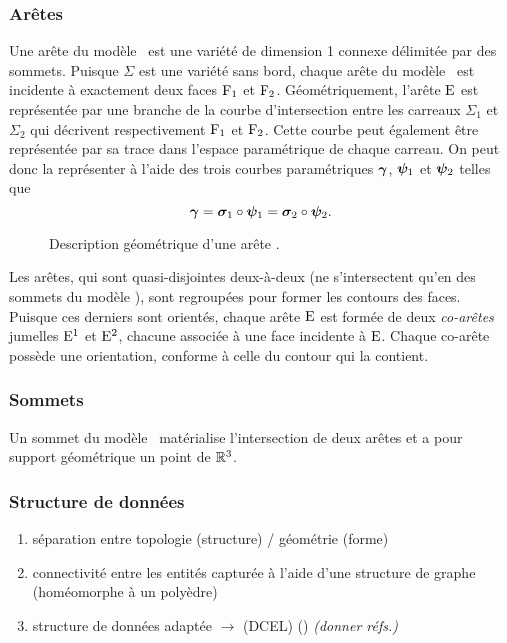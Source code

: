 \subsubsection{Arêtes}
Une arête du modèle \brep\ est une variété de dimension 1 connexe délimitée par des sommets.
Puisque $\Sigma$ est une variété sans bord, chaque arête du modèle \brep\ est incidente à exactement deux faces $\mathrm{F}_1$ et $\mathrm{F}_2$. 
Géométriquement, l'arête $\mathrm{E}$ est représentée par une branche de la courbe d'intersection entre les carreaux $\Sigma_1$ et $\Sigma_2$ qui décrivent respectivement $\mathrm{F}_1$ et $\mathrm{F}_2$. 
Cette courbe peut également être représentée par sa trace dans l'espace paramétrique de chaque carreau. 
On peut donc la représenter à l'aide des trois courbes paramétriques $\bm{\gamma}$, $\bm{\psi}_1$ et $\bm{\psi}_2$ telles que
\begin{equation}
	\bm{\gamma} = \bm{\sigma}_1 \circ \bm{\psi}_1 = \bm{\sigma}_2 \circ \bm{\psi}_2.
\end{equation}

\begin{figure}
	\centering
	
	\caption{Description géométrique d'une arête \brep.}
\end{figure}

Les arêtes, qui sont quasi-disjointes deux-à-deux (\ie ne s'intersectent qu'en des sommets du modèle \brep), sont regroupées pour former les contours des faces. 
Puisque ces derniers sont orientés, chaque arête $\mathrm{E}$ est formée de deux \textit{co-arêtes} jumelles $\mathrm{E}^1$ et $\mathrm{E}^2$, chacune associée à une face incidente à $\mathrm{E}$. 
Chaque co-arête possède une orientation, conforme à celle du contour qui la contient.


\subsubsection{Sommets}
Un sommet du modèle \brep\ matérialise l'intersection de deux arêtes et a pour support géométrique un point de $\mathbb{R}^3$.

\subsubsection{Structure de données}
\begin{enumerate}
	\item séparation entre topologie (structure) / géométrie (forme)
	\item connectivité entre les entités capturée à l'aide d'une structure de graphe (homéomorphe à un polyèdre)
	\item structure de données adaptée $\to$  (DCEL) () \textit{(donner réfs.)}
\end{enumerate}

